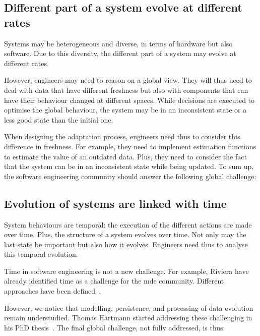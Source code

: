 \subsection{Different part of a system evolve at different rates}
\label{intro:challenges:diff-paces}
Systems may be heterogeneous and diverse, in terms of hardware but also software.
Due to this diversity, the different part of a system may evolve at different rates.

However, engineers may need to reason on a global view.
They will thus need to deal with data that have different freshness but also with components that can have their behaviour changed at different spaces.
While decisions are executed to optimise the global behaviour, the system may be in an inconsistent state or a less good state than the initial one.

When designing the adaptation process, engineers need thus to consider this difference in freshness.
For example, they need to implement estimation functions to estimate the value of an outdated data.
Plus, they need to consider the fact that the system can be in an inconsistent state while being updated.
To sum up, the software engineering community should answer the following global challenge:
\vspace{-2em}

\subsection{Evolution of systems are linked with time}
\label{intro:challenges:evol-syst}
System behaviours are temporal: the execution of the different actions are made over time.
Plus, the structure of a system evolves over time.
Not only may the last state be important but also how it evolves.
Engineers need thus to analyse this temporal evolution.

Time in software engineering is not a new challenge.
For example, Riviera \etal \cite{DBLP:conf/models/RiveraRV08} have already identified time as a challenge for the \gls{mde} community.
Different approaches have been defined~\cite{DBLP:conf/sle/BousseCCGB15, DBLP:conf/sle/KansoT12, DBLP:conf/icse/KoegelH10, DBLP:conf/seke/0001FNMKT14}.

However, we notice that modelling, persistence, and processing of data evolution remain understudied.
Thomas Hartmann started addressing these challenging in his PhD thesis~\cite{DBLP:phd/basesearch/Hartmann16}.
The final global challenge, not fully addressed, is thus:
\vspace{-2em}
